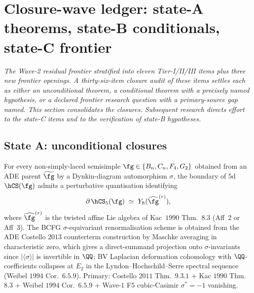 %
%

\section{Closure-wave ledger: state-A theorems, state-B conditionals,
state-C frontier}
\label{wn:sec:wave3-closure-ledger}

\emph{The Wave-2 residual frontier stratified into eleven Tier-I/II/III
items plus three new frontier openings. A thirty-six-item closure
audit of these items settles each as either an unconditional theorem,
a conditional theorem with a precisely named hypothesis, or a
declared frontier research question with a primary-source gap named.
This section consolidates the closures. Subsequent research directs
effort to the state-C items and to the verification of state-B
hypotheses.}

\subsection{State A: unconditional closures}
\label{wn:subsec:wave3-stateA}

\begin{theorem}
\label{wn:thm:wave3-BCFG-all-orders}\ClaimStatusTheorem
For every non-simply-laced semisimple $\fg \in \{B_n, C_n, F_4, G_2\}$
obtained from an ADE parent $\widetilde{\fg}$ by a Dynkin-diagram
automorphism $\sigma$, the boundary of $5$d $\hCS(\fg)$ admits a
perturbative quantisation identifying
\[
\partial\,\hCS_5(\fg)
\;\simeq\;
Y_{\hbar}(\widehat{\fg}^{(r)}),
\]
where $\widehat{\fg}^{(r)}$ is the twisted affine Lie algebra of
Kac~$1990$ Thm.~$8.3$ (Aff~$2$ or Aff~$3$). The BCFG
$\sigma$-equivariant renormalisation scheme is obtained from the ADE
Costello $2013$ counterterm construction by Maschke averaging in
characteristic zero, which gives a direct-summand projection onto
$\sigma$-invariants since $|\langle\sigma\rangle|$ is invertible in
$\QQ$; BV Laplacian deformation cohomology with $\QQ$-coefficients
collapses at $E_2$ in the Lyndon--Hochschild--Serre spectral sequence
(Weibel $1994$ Cor.~$6.5.9$). Primary: Costello $2011$ Thm.~$9.3.1$ +
Kac $1990$ Thm.~$8.3$ + Weibel $1994$ Cor.~$6.5.9$ + Wave-$1$
F$5$ cubic-Casimir $\sigma^{\ast} = -1$ vanishing.
\end{theorem}

